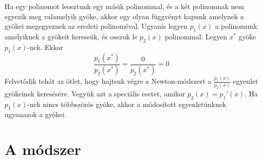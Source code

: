 \documentclass[a4paper,12pt]{report}
\begin{document}
			Ha egy polinomot leosztunk egy másik polinommal, és a két polinomnak nem egyezik meg valamelyik gyöke, akkor egy olyan függvényt kapunk amelynek a gyökei megegyeznek az eredeti polinoméval. Ugyanis legyen $p_1(x)$ a polinomunk amelyiknek a gyökeit keressük, és osszuk le $p_2(x)$ polinommal. Legyen $x^*$ gyöke $p_1(x)$-nek. Ekkor
			\[ \frac{p_1(x^*)}{p_2(x^*)}=\frac{0}{p_2(x^*)}=0\]
			Felvetődik tehát az ötlet, hogy hajtsuk végre a Newton-módszert a $\frac{p_1(x)}{p_2(x)}$ egyenlet gyökeinek keresésére. Vegyük azt a speciális esetet, amikor $p_2(x)=p_1'(x)$. Ha $p_1(x)$-nek nincs többszörös gyöke, akkor a módosított egyenletünknek ugyanazok a gyökei.
			
			\begin{figure}[ht]
				\hfill
				\caption{}
			\end{figure}
   




		\section{A módszer}
            
\end{document}
